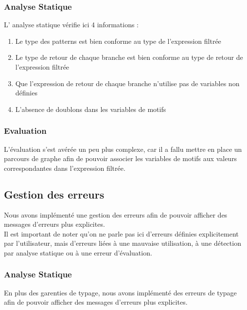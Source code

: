 \documentclass[
  12pt,
]{article}
\begin{document}
\subsubsection{Analyse Statique}\label{analyse-statique}

L' analyse statique vérifie ici 4 informations :

\begin{enumerate}
      \item
            Le type des patterns est bien conforme au type de l'expression filtrée
      \item
            Le type de retour de chaque branche est bien conforme au type de retour de l'expression filtrée
      \item
            Que l'expression de retour de chaque branche n'utilise pas de variables non définies
      \item
            L'absence de doublons dans les variables de motifs
\end{enumerate}

\subsubsection{Evaluation}\label{evaluation}

L'évaluation s'est avérée un peu plus complexe, car il a fallu mettre en
place un parcours de graphe afin de pouvoir associer les variables de
motifs aux valeurs correspondantes dans l'expression filtrée.

\pagebreak

\subsection{Gestion des erreurs}\label{gestion-des-erreurs}

Nous avons implémenté une gestion des erreurs afin de pouvoir afficher
des messages d'erreurs plus explicites.\\
Il est important de noter qu'on ne parle pas ici d'erreurs définies
explicitement par l'utilisateur, mais d'erreurs liées à une mauvaise
utilisation, à une détection par analyse statique ou à une erreur
d'évaluation.

\subsubsection{Analyse Statique}\label{analyse-statique-1}

En plus des garenties de typage, nous avons implémenté des erreurs de
typage afin de pouvoir afficher des messages d'erreurs plus explicites.
\end{document}
